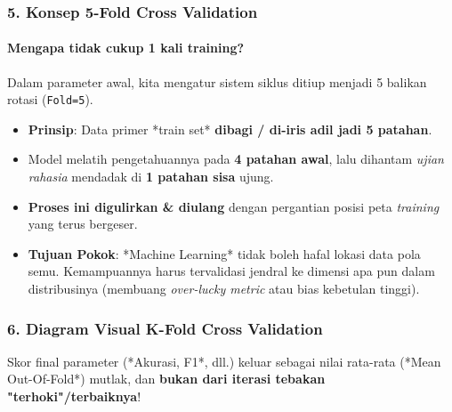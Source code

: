 \documentclass[t,aspectratio=169,xcolor=dvipsnames]{beamer}
\begin{document}
\begin{frame}
    \frametitle{5. Konsep 5-Fold Cross Validation}
    \framesubtitle{Mengapa tidak cukup 1 kali training?}
    \small
    Dalam parameter awal, kita mengatur sistem siklus ditiup menjadi 5 balikan rotasi (\texttt{Fold=5}).
    \vspace{0.2cm}
    \begin{itemize}
        \item \textbf{Prinsip}: Data primer *train set*\textbf{ dibagi / di-iris adil jadi 5 patahan}. 
        \item Model melatih pengetahuannya pada \textbf{4 patahan awal}, lalu dihantam \textit{ujian rahasia} mendadak di \textbf{1 patahan sisa} ujung. 
        \item \textbf{Proses ini digulirkan \& diulang} dengan pergantian posisi peta \textit{training} yang terus bergeser.
        \item \textbf{Tujuan Pokok}: *Machine Learning* tidak boleh hafal lokasi data pola semu. Kemampuannya harus tervalidasi jendral ke dimensi apa pun dalam distribusinya (membuang \textit{over-lucky metric} atau bias kebetulan tinggi).
    \end{itemize}
\end{frame}

\begin{frame}
    \frametitle{6. Diagram Visual K-Fold Cross Validation}
    \begin{center}
    \end{center}
    \vspace{0.2cm}
    \footnotesize Skor final parameter (*Akurasi, F1*, dll.) keluar sebagai nilai rata-rata (*Mean Out-Of-Fold*) mutlak, dan \textbf{bukan dari iterasi tebakan "terhoki"/terbaiknya}!
\end{frame}
\end{document}
